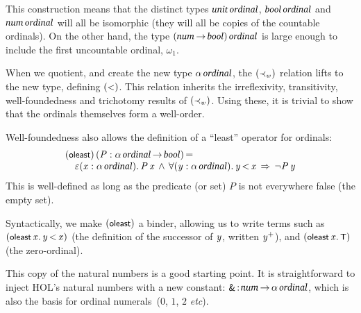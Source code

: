 \documentclass[11pt]{llncs}
\renewcommand{\HOLConst}[1]{{\textsf{\upshape\small #1}}}
\renewcommand{\HOLTyOp}[1]{\mbox{\fontencoding{T1}\fontfamily{bch}\fontseries{m}\fontshape{it}\fontsize{9.5}{10}\selectfont #1}}
\renewcommand{\HOLinline}[1]{\ensuremath{#1}}
\newenvironment{holmath}{\begin{displaymath}\begin{array}{l}}{\end{array}\end{displaymath}\ignorespacesafterend}
\begin{document}
This construction means that the distinct types \HOLinline{\HOLTyOp{unit}\,\HOLTyOp{ordinal}}, \HOLinline{\HOLTyOp{bool}\,\HOLTyOp{ordinal}} and \HOLinline{\HOLTyOp{num}\,\HOLTyOp{ordinal}} will all be isomorphic (they will all be copies of the countable ordinals).
On the other hand, the type \HOLinline{(\HOLTyOp{num}\,\ensuremath{{\rightarrow}}\,\HOLTyOp{bool})\,\HOLTyOp{ordinal}} is large enough to include the first uncountable ordinal, $\omega_1$.

When we quotient, and create the new type \HOLinline{\ensuremath{\alpha}\,\HOLTyOp{ordinal}}, the \HOLinline{(\HOLConst{{\ensuremath{\prec_w}}})} relation lifts to the new type, defining \HOLinline{(\HOLConst{\ensuremath{{<}}})}.
This relation inherits the irreflexivity, transitivity, well-foundedness and trichotomy results of \HOLinline{(\HOLConst{{\ensuremath{\prec_w}}})}.
Using these, it is trivial to show that the ordinals themselves form a well-order.

\begin{definition}
Well-foundedness also allows the definition of a ``least'' operator for ordinals:
\begin{holmath}
(\HOLConst{\HOLConst{oleast}})\,(\HOLFreeVar{P} :\ensuremath{\alpha}\,\HOLTyOp{ordinal}\,\ensuremath{{\rightarrow}}\,\HOLTyOp{bool})\,{\ensuremath{=}}\\
\,\,\,\,\,\,\HOLTokenHilbert{}(\HOLBoundVar{x} :\ensuremath{\alpha}\,\HOLTyOp{ordinal})\ensuremath{.}\,\HOLFreeVar{P}\,\HOLBoundVar{x}\,\HOLTokenConj{}\,\ensuremath{{\forall}}(\HOLBoundVar{y} :\ensuremath{\alpha}\,\HOLTyOp{ordinal})\ensuremath{.}\,\HOLBoundVar{y}\,\ensuremath{{<}}\,\HOLBoundVar{x}\,\HOLTokenImp{}\,\HOLTokenNeg{}\HOLFreeVar{P}\,\HOLBoundVar{y}
\end{holmath}
This is well-defined as long as the predicate (or set) $P$ is not everywhere false (the empty set).
\end{definition}

\noindent Syntactically, we make \HOLinline{(\HOLConst{\HOLConst{oleast}})} a binder, allowing us to write terms such as $(\HOLinline{\HOLConst{oleast}\,\HOLBoundVar{x}\ensuremath{.}\,\HOLFreeVar{y}\,\ensuremath{{<}}\,\HOLBoundVar{x}})$ (the definition of the successor of \HOLinline{\HOLFreeVar{y}}, written \HOLinline{\HOLFreeVar{y}\HOLTokenSupPlus{}}), and $(\HOLinline{\HOLConst{oleast}\,\HOLBoundVar{x}\ensuremath{.}\,\HOLConst{T}})$ (the zero-ordinal).

This copy of the natural numbers is a good starting point.
It is straightforward to inject HOL's natural numbers with a new constant: \HOLinline{\HOLConst{\&}\,{:}}\HOLinline{\HOLTyOp{num}\,\ensuremath{{\rightarrow}}\,\ensuremath{\alpha}\,\HOLTyOp{ordinal}}, which is also the basis for ordinal numerals~($0$, $1$, $2$ \emph{etc}).
\end{document}
